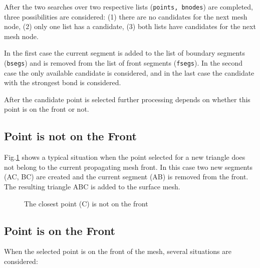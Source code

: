 \documentclass[12pt]{article}
\begin{document}
After the two searches over two respective lists ({\tt points, bnodes}) are
completed, three possibilities are considered: 
(1) 
there are no candidates for the next mesh node,
(2) 
only one list has a candidate, 
(3) 
both lists have candidates for the next mesh node. 

In the first case the current segment is added to the list of boundary segments
({\tt bsegs}) and is removed from the list of front segments ({\tt fsegs}). In
the second case the only available candidate is considered, and in the last
case the candidate with the strongest bond is considered.

After the candidate point is selected further processing depends on whether
this point is on the front or not.


\subsection{Point is not on the Front}


Fig.\ref{newpoint} shows a typical situation when the point selected for a new triangle does not belong to the current propagating mesh front. In this case two new segments (AC, BC) are created and the current segment (AB) is removed from the front. The resulting triangle ABC is added to the surface mesh.

\begin{figure}
\center
{}
\caption{\label{newpoint}The closest point (C) is not on the front}
\end{figure}


\subsection{Point is on the Front}

When the selected point is on the front of the mesh, several situations are considered:
\end{document}
